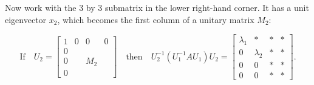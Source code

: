 Now work with the 3 by 3 submatrix in the lower right-hand corner. It has a unit eigenvector \(x_{2}\), which becomes the first column of a unitary matrix \(M_{2}\):

\[\text{If}\quad U_{2}=\begin{bmatrix}1&0&0&0\\ 0&&&\\ 0&&M_{2}&\\ 0&&&\end{bmatrix}\quad\text{then}\quad U_{2}^{-1}(U_{1}^{-1}AU_{1})U_{2}= \begin{bmatrix}\lambda_{1}&*&*&*\\ 0&\lambda_{2}&*&*\\ 0&0&*&*\\ 0&0&*&*\end{bmatrix}.\] 